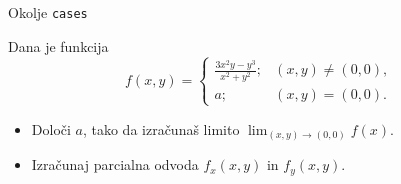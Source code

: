 \begin{frame}{Okolje \texttt{cases}}
	
	Dana je funkcija
	\[
	f(x,y) = 
	\begin{cases}
	\frac{3x^2y-y^3}{x^2+y^2};&  (x,y) \neq (0,0), \\
	a; &                         (x,y) = (0,0).
	\end{cases}
	\]

	\begin{itemize} 
	\item Določi $a$, tako da izračunaš limito \( \lim_{(x,y)\to(0,0)} f(x). \)
	\item Izračunaj parcialna odvoda $f_x(x,y)$ in $f_y(x,y)$.
	\end{itemize}
\end{frame}
